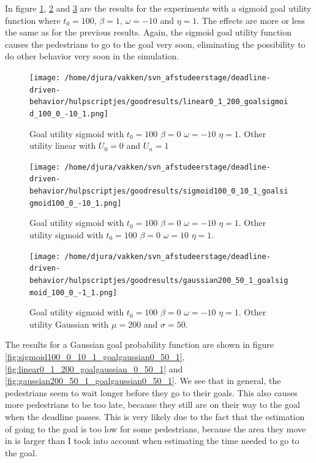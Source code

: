 \documentclass[11pt]{book}
\begin{document}
\clearpage

In figure \ref{fig:linear0_1_200_goalsigmoid_100_0_-10_1}, \ref{fig:sigmoid100_0_10_1_goalsigmoid100_0_-10_1} and \ref{fig:gaussian200_50_1_goalsigmoid_100_0_-10_1} are the results for the experiments with a sigmoid goal utility function where $t_0=100$, $\beta=1$, $\omega=-10$ and $\eta=1$. The effects are more or less the same as for the previous results. Again, the sigmoid goal utility function causes the pedestrians to go to the goal very soon, eliminating the possibility to do other behavior very soon in the simulation.

\begin{figure}[h!]
\centering
\texttt{[image: /home/djura/vakken/svn\_afstudeerstage/deadline-driven-behavior/hulpscriptjes/goodresults/linear0\_1\_200\_goalsigmoid\_100\_0\_-10\_1.png]}
\caption{Goal utility sigmoid with $t_0=100$ $\beta=0$ $\omega=-10$ $\eta=1$. Other utility linear with $U_0=0$ and $U_n=1$}
\label{fig:linear0_1_200_goalsigmoid_100_0_-10_1}
\end{figure}


\begin{figure}[h!]
\centering
\texttt{[image: /home/djura/vakken/svn\_afstudeerstage/deadline-driven-behavior/hulpscriptjes/goodresults/sigmoid100\_0\_10\_1\_goalsigmoid100\_0\_-10\_1.png]}
\caption{Goal utility sigmoid with $t_0=100$ $\beta=0$ $\omega=-10$ $\eta=1$. Other utility sigmoid with $t_0=100$ $\beta=0$ $\omega=10$ $\eta=1$.}
\label{fig:sigmoid100_0_10_1_goalsigmoid100_0_-10_1}
\end{figure}

\begin{figure}[h!]
\centering
\texttt{[image: /home/djura/vakken/svn\_afstudeerstage/deadline-driven-behavior/hulpscriptjes/goodresults/gaussian200\_50\_1\_goalsigmoid\_100\_0\_-1\_1.png]}
\caption{Goal utility sigmoid with $t_0=100$ $\beta=0$ $\omega=-10$ $\eta=1$. Other utility Gaussian with $\mu=200$ and $\sigma=50$.}
\label{fig:gaussian200_50_1_goalsigmoid_100_0_-10_1}
\end{figure}

The results for a Gaussian goal probability function are shown in figure \ref{fig:sigmoid100_0_10_1_goalgaussian0_50_1}, \ref{fig:linear0_1_200_goalgaussian_0_50_1} and \ref{fig:gaussian200_50_1_goalgaussian0_50_1}. We see that in general, the pedestrians seem to wait longer before they go to their goals. This also causes more pedestrians to be too late, because they still are on their way to the goal when the deadline passes. This is very likely due to the fact that the estimation of going to the goal is too low for some pedestrians, because the area they move in is larger than I took into account when estimating the time needed to go to the goal. 
\end{document}
